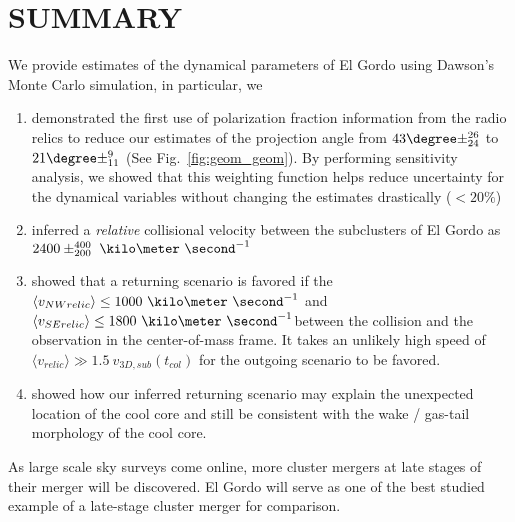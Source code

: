 \section{SUMMARY} 
We provide estimates of the dynamical parameters of El Gordo using Dawson's
Monte Carlo simulation, in particular, we 
\begin{enumerate}
	\item demonstrated the first use of polarization fraction information from
		the radio relics to reduce our estimates of the projection angle from
		$43\degree \pm ^{26}_{24}$ to $21 \degree \pm^{9}_{11}$ (See
		Fig.~\ref{fig:geom_geom}). By performing sensitivity analysis, we
		showed that this weighting function helps reduce uncertainty for the dynamical
		variables without changing the estimates drastically ($< 20\%$) \\ 
	\item inferred a {\it relative} collisional velocity between the
		subclusters of El Gordo as $2400\pm^{400}_{200}~\kilo\meter~\second^{-1}$ \\ 
	\item showed that a returning scenario is favored if the $\langle v_{NW relic}\rangle \leq
		1000~\kilo
		\meter~\second^{-1}$ and $\langle v_{SE relic}\rangle \leq
		1800~\kilo\meter~\second^{-1}$between the collision and the observation in the
		center-of-mass frame. It takes
		an unlikely high speed of $\langle v_{relic} \rangle \gg 1.5~v_{3D,
		sub}(t_{col})$ for the outgoing scenario to be favored. \\ 
	\item showed how our inferred
		returning scenario may explain the unexpected location of the cool
		core and still be consistent with the wake / gas-tail morphology of the cool core. 
\end{enumerate}
As large scale sky surveys come online, more cluster mergers at late
stages of their merger will be discovered. El Gordo will serve as one of
the best studied example of a late-stage cluster merger for comparison.  
